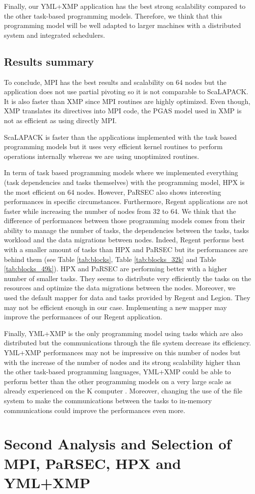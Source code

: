 Finally, our YML+XMP application has the best strong scalability compared to the other task-based programming models.
Therefore, we think that this programming model will be well adapted to larger machines with a distributed system and integrated schedulers.

\subsection{Results summary}
To conclude, MPI has the best results and scalability on 64 nodes but the application does not use partial pivoting so it is not comparable to ScaLAPACK.
It is also faster than XMP since MPI routines are highly optimized.
Even though, XMP translates its directives into MPI code, the PGAS model used in XMP is not as efficient as using directly MPI.

ScaLAPACK is faster than the applications implemented with the task based programming models but it uses very efficient kernel routines to perform operations internally whereas we are using unoptimized routines.

In term of task based programming models where we implemented everything (task dependencies and tasks themselves) with the programming model, HPX is the most efficient on 64 nodes.
However, PaRSEC also shows interesting performances in specific circumstances.
Furthermore, Regent applications are not faster while increasing the number of nodes from 32 to 64.
We think that the difference of performances between those programming models comes from their ability to manage the number of tasks, the dependencies between the tasks, tasks workload and the data migrations between nodes.
Indeed, Regent performs best with a smaller amount of tasks than HPX and PaRSEC but its performances are behind them (see Table \ref{tab:blocks}, Table \ref{tab:blocks_32k} and Table \ref{tab:blocks_49k}).
HPX and PaRSEC are performing better with a higher number of smaller tasks.
They seems to distribute very efficiently the tasks on the resources and optimize the data migrations between the nodes.
Moreover, we used the default mapper for data and tasks provided by Regent and Legion.
They may not be efficient enough in our case.
Implementing a new mapper may improve the performances of our Regent application.

Finally, YML+XMP is the only programming model using tasks which are also distributed but the communications through the file system decrease its efficiency.
YML+XMP performances may not be impressive on this number of nodes but with the increase of the number of nodes and its strong scalability higher than the other task-based programming languages, YML+XMP could be able to perform better than the other programming models on a very large scale as already experienced on the K computer \cite{GuTPS2019}.
Moreover, changing the use of the file system to make the communications between the tasks to in-memory communications could improve the performances even more.


\section{Second Analysis and Selection of MPI, PaRSEC, HPX and YML+XMP}